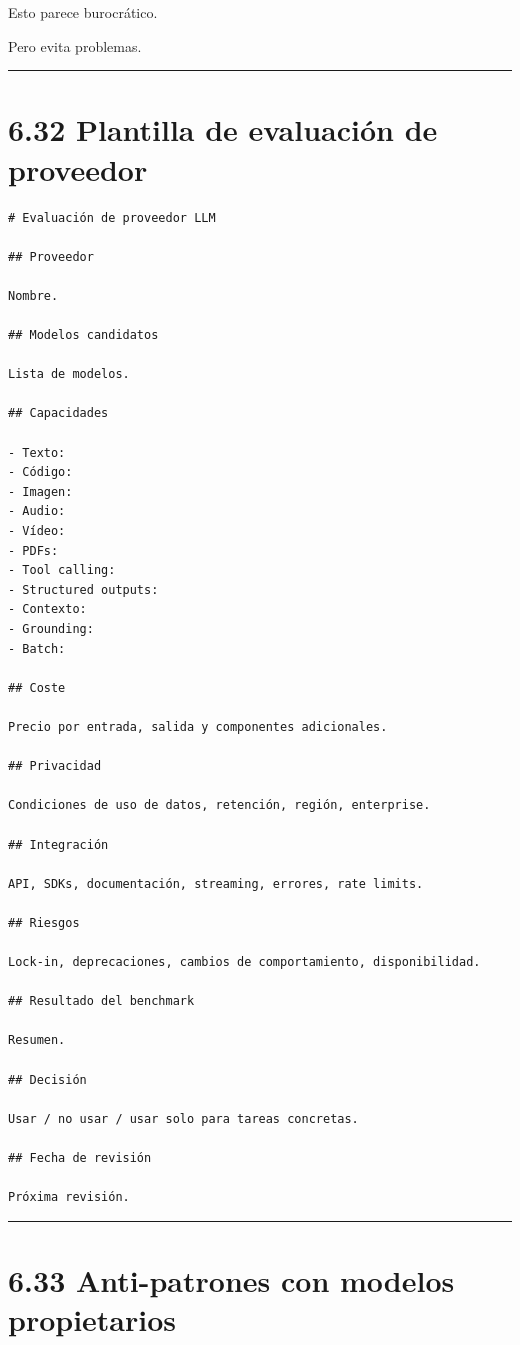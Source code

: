 Esto parece burocrático.

Pero evita problemas.

\begin{center}\rule{0.5\linewidth}{0.5pt}\end{center}

\section{6.32 Plantilla de evaluación de
proveedor}\label{plantilla-de-evaluaciuxf3n-de-proveedor}

\begin{lstlisting}
# Evaluación de proveedor LLM

## Proveedor

Nombre.

## Modelos candidatos

Lista de modelos.

## Capacidades

- Texto:
- Código:
- Imagen:
- Audio:
- Vídeo:
- PDFs:
- Tool calling:
- Structured outputs:
- Contexto:
- Grounding:
- Batch:

## Coste

Precio por entrada, salida y componentes adicionales.

## Privacidad

Condiciones de uso de datos, retención, región, enterprise.

## Integración

API, SDKs, documentación, streaming, errores, rate limits.

## Riesgos

Lock-in, deprecaciones, cambios de comportamiento, disponibilidad.

## Resultado del benchmark

Resumen.

## Decisión

Usar / no usar / usar solo para tareas concretas.

## Fecha de revisión

Próxima revisión.
\end{lstlisting}

\begin{center}\rule{0.5\linewidth}{0.5pt}\end{center}

\section{6.33 Anti-patrones con modelos
propietarios}\label{anti-patrones-con-modelos-propietarios}

